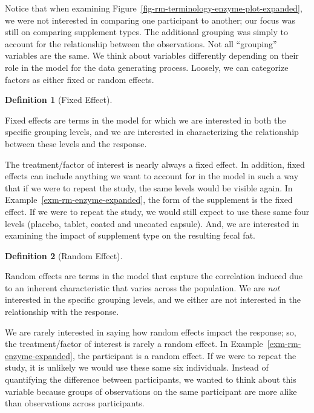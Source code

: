 \documentclass[
  letterpaper,
  DIV=11,
  numbers=noendperiod]{scrreprt}
\theoremstyle{definition}
\theoremstyle{definition}
\newtheorem{definition}{Definition}[chapter]
\theoremstyle{remark}
\begin{document}
Notice that when examining
Figure~\ref{fig-rm-terminology-enzyme-plot-expanded}, we were not
interested in comparing one participant to another; our focus was still
on comparing supplement types. The additional grouping was simply to
account for the relationship between the observations. Not all
``grouping'' variables are the same. We think about variables
differently depending on their role in the model for the data generating
process. Loosely, we can categorize factors as either fixed or random
effects.

\begin{definition}[Fixed
Effect]\protect\hypertarget{def-fixed-effect}{}\label{def-fixed-effect}

Fixed effects are terms in the model for which we are interested in both
the specific grouping levels, and we are interested in characterizing
the relationship between these levels and the response.

\end{definition}

The treatment/factor of interest is nearly always a fixed effect. In
addition, fixed effects can include anything we want to account for in
the model in such a way that if we were to repeat the study, the same
levels would be visible again. In Example~\ref{exm-rm-enzyme-expanded},
the form of the supplement is the fixed effect. If we were to repeat the
study, we would still expect to use these same four levels (placebo,
tablet, coated and uncoated capsule). And, we are interested in
examining the impact of supplement type on the resulting fecal fat.

\begin{definition}[Random
Effect]\protect\hypertarget{def-random-effect}{}\label{def-random-effect}

Random effects are terms in the model that capture the correlation
induced due to an inherent characteristic that varies across the
population. We are \emph{not} interested in the specific grouping
levels, and we either are not interested in the relationship with the
response.

\end{definition}

We are rarely interested in saying how random effects impact the
response; so, the treatment/factor of interest is rarely a random
effect. In Example~\ref{exm-rm-enzyme-expanded}, the participant is a
random effect. If we were to repeat the study, it is unlikely we would
use these same six individuals. Instead of quantifying the difference
between participants, we wanted to think about this variable because
groups of observations on the same participant are more alike than
observations across participants.
\end{document}
